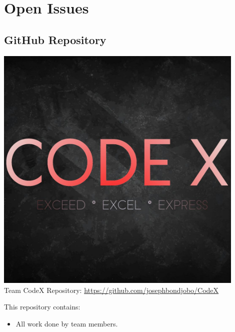 \documentclass[a4paper,10pt]{article}
\begin{document}
\clearpage

\section{Open Issues}
\subsection {GitHub Repository}
\includegraphics[width=12cm]{CodeX_logo.jpg} \\
Team CodeX Repository: \url{https://github.com/josephbondjobo/CodeX}

This repository contains:
\begin{itemize}
\item All work done by team members.
\end{itemize}



\newpage
\clearpage
{}
\end{document}
